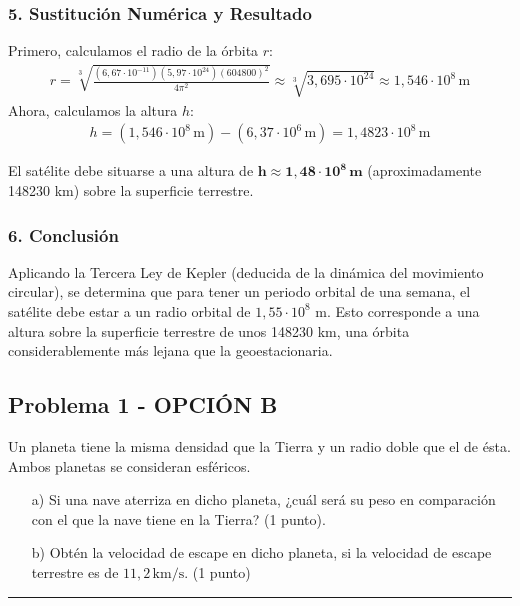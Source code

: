 \subsubsection*{5. Sustitución Numérica y Resultado}
Primero, calculamos el radio de la órbita $r$:
\begin{gather}
    r = \sqrt[3]{\frac{(6,67\cdot10^{-11})(5,97\cdot10^{24})(604800)^2}{4\pi^2}} \approx \sqrt[3]{3,695 \cdot 10^{24}} \approx 1,546 \cdot 10^8 \, \text{m}
\end{gather}
Ahora, calculamos la altura $h$:
\begin{gather}
    h = (1,546 \cdot 10^8 \, \text{m}) - (6,37 \cdot 10^6 \, \text{m}) = 1,4823 \cdot 10^8 \, \text{m}
\end{gather}
\begin{cajaresultado}
El satélite debe situarse a una altura de $\boldsymbol{h \approx 1,48 \cdot 10^8 \, \textbf{m}}$ (aproximadamente 148230 km) sobre la superficie terrestre.
\end{cajaresultado}

\subsubsection*{6. Conclusión}
\begin{cajaconclusion}
Aplicando la Tercera Ley de Kepler (deducida de la dinámica del movimiento circular), se determina que para tener un periodo orbital de una semana, el satélite debe estar a un radio orbital de $1,55 \cdot 10^8$ m. Esto corresponde a una altura sobre la superficie terrestre de unos 148230 km, una órbita considerablemente más lejana que la geoestacionaria.
\end{cajaconclusion}

\newpage

\subsection{Problema 1 - OPCIÓN B}
\label{subsec:1B_2015_jul_ext}

\begin{cajaenunciado}
Un planeta tiene la misma densidad que la Tierra y un radio doble que el de ésta. Ambos planetas se consideran esféricos.
\begin{enumerate}
    \item[a)] Si una nave aterriza en dicho planeta, ¿cuál será su peso en comparación con el que la nave tiene en la Tierra? (1 punto).
    \item[b)] Obtén la velocidad de escape en dicho planeta, si la velocidad de escape terrestre es de $11,2\,\text{km/s}$. (1 punto)
\end{enumerate}
\end{cajaenunciado}
\hrule

